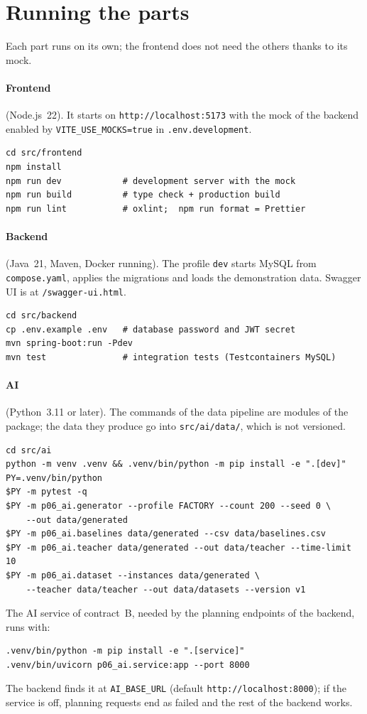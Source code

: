 \section{Running the parts}
\label{sec:dev-run}

Each part runs on its own; the frontend does not need the others thanks to its mock.

\paragraph{Frontend} (Node.js~22). It starts on \texttt{http://localhost:5173} with the mock of
the backend enabled by \texttt{VITE\_USE\_MOCKS=true} in \texttt{.env.development}.
\begin{lstlisting}
cd src/frontend
npm install
npm run dev            # development server with the mock
npm run build          # type check + production build
npm run lint           # oxlint;  npm run format = Prettier
\end{lstlisting}

\paragraph{Backend} (Java~21, Maven, Docker running). The profile \texttt{dev} starts MySQL from
\texttt{compose.yaml}, applies the migrations and loads the demonstration data. Swagger UI is at
\texttt{/swagger-ui.html}.
\begin{lstlisting}
cd src/backend
cp .env.example .env   # database password and JWT secret
mvn spring-boot:run -Pdev
mvn test               # integration tests (Testcontainers MySQL)
\end{lstlisting}

\paragraph{AI} (Python~3.11 or later). The commands of the data pipeline are modules of the
package; the data they produce go into \texttt{src/ai/data/}, which is not versioned.
\begin{lstlisting}
cd src/ai
python -m venv .venv && .venv/bin/python -m pip install -e ".[dev]"
PY=.venv/bin/python
$PY -m pytest -q
$PY -m p06_ai.generator --profile FACTORY --count 200 --seed 0 \
    --out data/generated
$PY -m p06_ai.baselines data/generated --csv data/baselines.csv
$PY -m p06_ai.teacher data/generated --out data/teacher --time-limit 10
$PY -m p06_ai.dataset --instances data/generated \
    --teacher data/teacher --out data/datasets --version v1
\end{lstlisting}
The AI service of contract~B, needed by the planning endpoints of the backend, runs with:
\begin{lstlisting}
.venv/bin/python -m pip install -e ".[service]"
.venv/bin/uvicorn p06_ai.service:app --port 8000
\end{lstlisting}
The backend finds it at \texttt{AI\_BASE\_URL} (default \texttt{http://localhost:8000}); if the
service is off, planning requests end as failed and the rest of the backend works.

